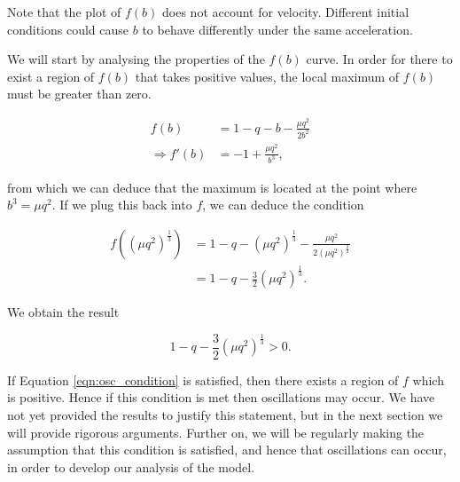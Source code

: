 \documentclass{article}
\begin{document}
Note that the plot of $f(b)$ does not account for velocity.
Different initial conditions could cause $b$ to behave differently under the same acceleration.

We will start by analysing the properties of the $f(b)$ curve.
In order for there to exist a region of $f(b)$ that takes positive values,
the local maximum of $f(b)$ must be greater than zero.

\begin{align}
    f(b)              & = 1 - q - b - \frac{\mu q^2}{2b^2} \\
    \Rightarrow f'(b) & = -1 + \frac{\mu q^2}{b^3},
\end{align}

from which we can deduce that the maximum is located at the point where $b^3 = \mu q^2$.
If we plug this back into $f$, we can deduce the condition

\begin{align}
    f((\mu q^2)^{\frac{1}{3}}) & = 1 - q - (\mu q^2)^{\frac{1}{3}} - \frac{\mu q^2}{2(\mu q^2)^{\frac{2}{3}}} \\
                               & = 1 - q - \frac{3}{2}(\mu q^2)^{\frac{1}{3}}.
\end{align}

We obtain the result

\begin{equation}
    1 - q - \frac{3}{2}(\mu q^2)^{\frac{1}{3}} > 0.
    \label{eqn:osc_condition}
\end{equation}

If Equation \ref{eqn:osc_condition} is satisfied,
then there exists a region of $f$ which is positive.
Hence if this condition is met then oscillations may occur. %
We have not yet provided the results to justify this statement, but in the next section we will provide rigorous arguments. %
Further on, we will be regularly making the assumption that this condition is satisfied,
and hence that oscillations can occur,
in order to develop our analysis of the model.

\end{document}

